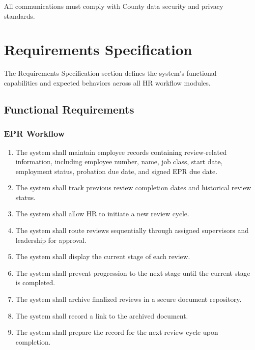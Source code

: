 \documentclass[12pt]{article}
\begin{document}
All communications must comply with County data security and privacy standards.

\section{Requirements Specification}

The Requirements Specification section defines the system’s functional capabilities and expected behaviors across all HR workflow modules.

\subsection{Functional Requirements}

\subsubsection{EPR Workflow}

\begin{enumerate}
    \item The system shall maintain employee records containing review-related information, including employee number, name, job class, start date, employment status, probation due date, and signed EPR due date.
    
    \item The system shall track previous review completion dates and historical review status.
    
    \item The system shall allow HR to initiate a new review cycle.
    
    \item The system shall route reviews sequentially through assigned supervisors and leadership for approval.
    
    \item The system shall display the current stage of each review.
    
    \item The system shall prevent progression to the next stage until the current stage is completed.
    
    \item The system shall archive finalized reviews in a secure document repository.
    
    \item The system shall record a link to the archived document.
    
    \item The system shall prepare the record for the next review cycle upon completion.
\end{enumerate}
\end{document}
